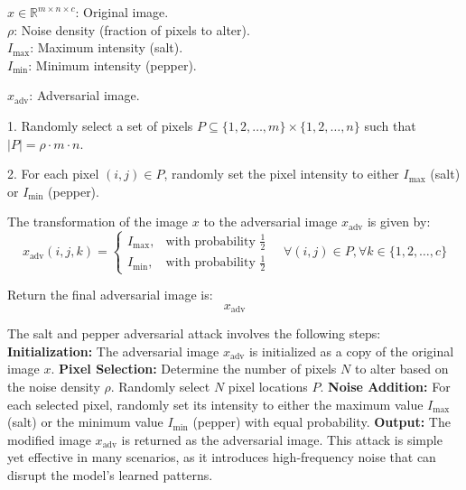 $x \in \mathbb{R}^{m \times n \times c}$: Original image. \\
$\rho$: Noise density (fraction of pixels to alter). \\
$I_{\text{max}}$: Maximum intensity (salt). \\
$I_{\text{min}}$: Minimum intensity (pepper).

$x_{\text{adv}}$: Adversarial image.

1. Randomly select a set of pixels $P \subseteq \{1, 2, \ldots, m\} \times \{1, 2, \ldots, n\}$ such that $|P| = \rho \cdot m \cdot n$.

2. For each pixel $(i, j) \in P$, randomly set the pixel intensity to either $I_{\text{max}}$ (salt) or $I_{\text{min}}$ (pepper).

The transformation of the image $x$ to the adversarial image $x_{\text{adv}}$ is given by:
\[
x_{\text{adv}}(i, j, k) = 
\begin{cases} 
I_{\text{max}}, & \text{with probability } \frac{1}{2} \\
I_{\text{min}}, & \text{with probability } \frac{1}{2}
\end{cases}
\quad \forall (i, j) \in P, \forall k \in \{1, 2, \ldots, c\}
\]

Return the final adversarial image is:
\[
x_{\text{adv}}
\]

The salt and pepper adversarial attack involves the following steps:
\textbf{Initialization:} The adversarial image $x_{\text{adv}}$ is initialized as a copy of the original image $x$.
\textbf{Pixel Selection:} Determine the number of pixels $N$ to alter based on the noise density $\rho$. Randomly select $N$ pixel locations $P$.
\textbf{Noise Addition:} For each selected pixel, randomly set its intensity to either the maximum value $I_{\text{max}}$ (salt) or the minimum value $I_{\text{min}}$ (pepper) with equal probability.
\textbf{Output:} The modified image $x_{\text{adv}}$ is returned as the adversarial image.
This attack is simple yet effective in many scenarios, as it introduces high-frequency noise that can disrupt the model's learned patterns.